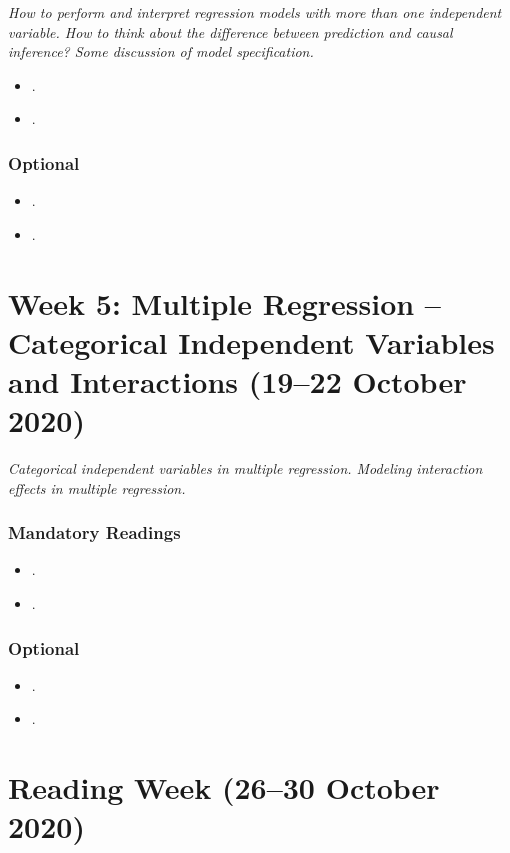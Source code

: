 \documentclass[abstract=on,parskip=full,headings=standardclasses,fontsize=11pt,paper=a4]{scrartcl}
\begin{document}
\textit{How to perform and interpret regression models with more than one independent variable. How to think about the difference between prediction and causal inference? Some discussion of model specification.}


\begin{itemize}
\item {}.
\item {}.
\end{itemize}

\subsubsection*{Optional}
\begin{itemize}
\item {}.
\item {}.
\end{itemize}


\section{Week 5: Multiple Regression -- Categorical Independent Variables and Interactions (19--22 October 2020)}


\textit{Categorical independent variables in multiple regression. Modeling interaction effects in multiple regression.}

\subsubsection*{Mandatory Readings}
\begin{itemize}
\item {}.
\item {}.
\end{itemize}


\subsubsection*{Optional}
\begin{itemize}
\item {}.
\item {}.
\end{itemize}

\section{Reading Week (26--30 October 2020) }
\end{document}

